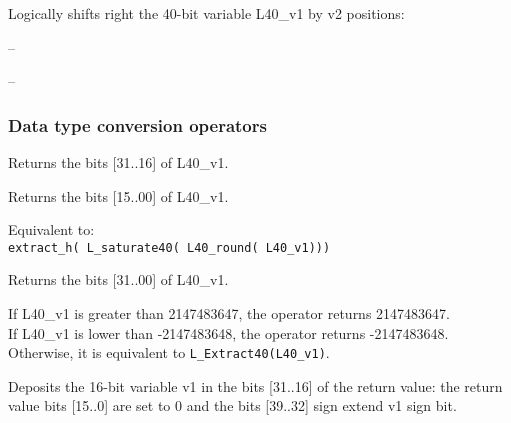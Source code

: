 
Logically shifts right the 40-bit variable L40\_v1 by v2 positions:

 -- 

 -- 

\subsubsection{Data type conversion operators}


Returns the bits [31..16] of L40\_v1.


Returns the bits [15..00] of L40\_v1.


Equivalent to:\\
{\tt extract\_h( L\_saturate40( L40\_round( L40\_v1))) }


Returns the bits [31..00] of L40\_v1.


If L40\_v1 is greater than 2147483647, the operator returns 2147483647. \\
If L40\_v1 is lower than -2147483648, the operator returns -2147483648. \\
Otherwise, it is equivalent to {\tt L\_Extract40(L40\_v1)}.



Deposits the 16-bit variable v1 in the bits [31..16] of the return
value: the return value bits [15..0] are set to 0 and the bits
[39..32] sign extend v1 sign bit.

